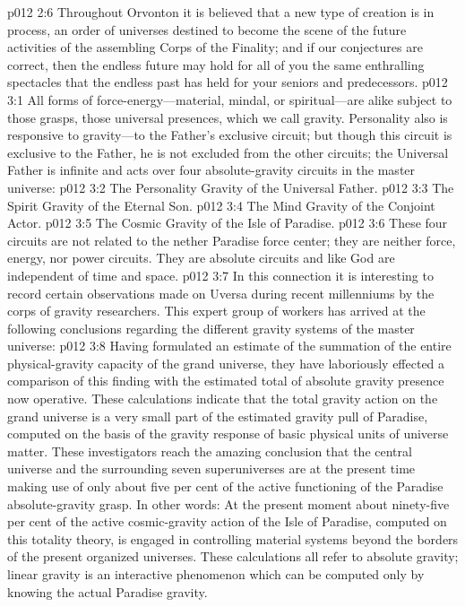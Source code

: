 \vs p012 2:6 Throughout Orvonton it is believed that a new type of creation is in process, an order of universes destined to become the scene of the future activities of the assembling Corps of the Finality; and if our conjectures are correct, then the endless future may hold for all of you the same enthralling spectacles that the endless past has held for your seniors and predecessors.
\vs p012 3:1 All forms of force\hyp{}energy---material, mindal, or spiritual---are alike subject to those grasps, those universal presences, which we call gravity. Personality also is responsive to gravity---to the Father’s exclusive circuit; but though this circuit is exclusive to the Father, he is not excluded from the other circuits; the Universal Father is infinite and acts over  four absolute\hyp{}gravity circuits in the master universe:
\pc \vs p012 3:2 \bibnobreakspace The Personality Gravity of the Universal Father.
\vs p012 3:3 \bibnobreakspace The Spirit Gravity of the Eternal Son.
\vs p012 3:4 \bibnobreakspace The Mind Gravity of the Conjoint Actor.
\vs p012 3:5 \bibnobreakspace The Cosmic Gravity of the Isle of Paradise.
\pc \vs p012 3:6 These four circuits are not related to the nether Paradise force center; they are neither force, energy, nor power circuits. They are absolute  circuits and like God are independent of time and space.
\vs p012 3:7 In this connection it is interesting to record certain observations made on Uversa during recent millenniums by the corps of gravity researchers. This expert group of workers has arrived at the following conclusions regarding the different gravity systems of the master universe:
\pc \vs p012 3:8 \bibnobreakspace {} Having formulated an estimate of the summation of the entire physical\hyp{}gravity capacity of the grand universe, they have laboriously effected a comparison of this finding with the estimated total of absolute gravity presence now operative. These calculations indicate that the total gravity action on the grand universe is a very small part of the estimated gravity pull of Paradise, computed on the basis of the gravity response of basic physical units of universe matter. These investigators reach the amazing conclusion that the central universe and the surrounding seven superuniverses are at the present time making use of only about five per cent of the active functioning of the Paradise absolute\hyp{}gravity grasp. In other words: At the present moment about ninety\hyp{}five per cent of the active cosmic\hyp{}gravity action of the Isle of Paradise, computed on this totality theory, is engaged in controlling material systems beyond the borders of the present organized universes. These calculations all refer to absolute gravity; linear gravity is an interactive phenomenon which can be computed only by knowing the actual Paradise gravity.
